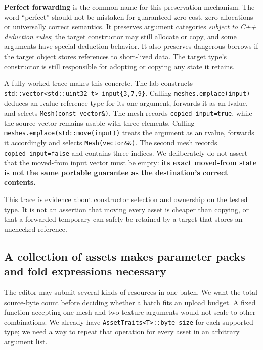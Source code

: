 \textbf{Perfect forwarding} is the common name for this preservation mechanism. The word ``perfect'' should not be mistaken for guaranteed zero cost, zero allocations or universally correct semantics. It preserves argument categories \emph{subject to C++ deduction rules}; the target constructor may still allocate or copy, and some arguments have special deduction behavior. It also preserves dangerous borrows if the target object stores references to short-lived data. The target type's constructor is still responsible for adopting or copying any state it retains.

A fully worked trace makes this concrete. The lab constructs \texttt{std::vector\textless{}std::uint32\_t\textgreater{}\ input\{3,7,9\}}. Calling \texttt{meshes.emplace(input)} deduces an lvalue reference type for its one argument, forwards it as an lvalue, and selects \texttt{Mesh(const\ vector\&)}. The mesh records \texttt{copied\_input=true}, while the source vector remains usable with three elements. Calling \texttt{meshes.emplace(std::move(input))} treats the argument as an rvalue, forwards it accordingly and selects \texttt{Mesh(vector\&\&)}. The second mesh records \texttt{copied\_input=false} and contains three indices. We deliberately do not assert that the moved-from input vector must be empty: \textbf{its exact moved-from state is not the same portable guarantee as the destination's correct contents.}

This trace is evidence about constructor selection and ownership on the tested type. It is not an assertion that moving every asset is cheaper than copying, or that a forwarded temporary can safely be retained by a target that stores an unchecked reference.

\subsection{A collection of assets makes parameter packs and fold expressions necessary}\label{05-engine-i-ch005-a-collection-of-assets-makes-parameter-packs-and-fold-expressions-necessary}

The editor may submit several kinds of resources in one batch. We want the total source-byte count before deciding whether a batch fits an upload budget. A fixed function accepting one mesh and two texture arguments would not scale to other combinations. We already have \texttt{AssetTraits\textless{}T\textgreater{}::byte\_size} for each supported type; we need a way to repeat that operation for every asset in an arbitrary argument list.


